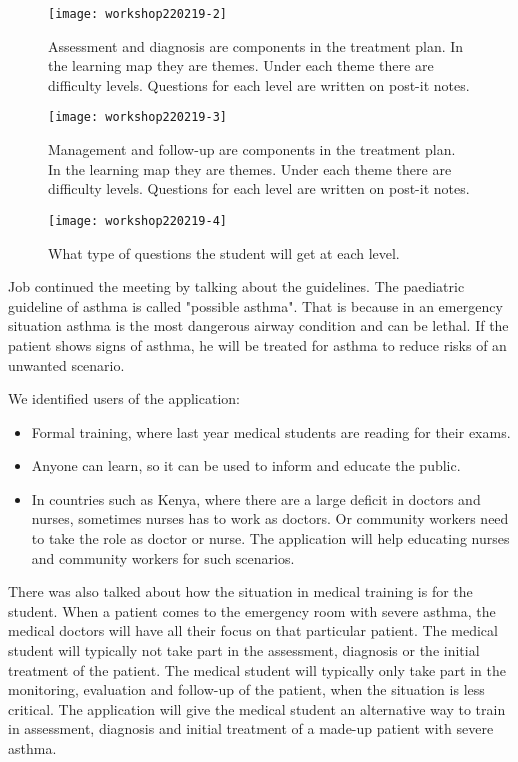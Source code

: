 \begin{figure}[h!]
	\caption {Assessment and diagnosis are components in the treatment plan. In the learning map they are themes. Under each theme there are difficulty levels. Questions for each level are written on post-it notes.}
	\texttt{[image: workshop220219-2]}
\end{figure}

\begin{figure}[h!]
	\caption {Management and follow-up are components in the treatment plan. In the learning map they are themes. Under each theme there are difficulty levels. Questions for each level are written on post-it notes.}
	\texttt{[image: workshop220219-3]}
\end{figure}

\begin{figure}[h!]
	\caption {What type of questions the student will get at each level.}
	\texttt{[image: workshop220219-4]}
\end{figure}

Job continued the meeting by talking about the guidelines. The paediatric guideline of asthma is called "possible asthma". That is because in an emergency situation asthma is the most dangerous airway condition and can be lethal. If the patient shows signs of asthma, he will be treated for asthma to reduce risks of an unwanted scenario.

We identified users of the application: 
\begin{itemize}
	\item Formal training, where last year medical students are reading for their exams.
	\item Anyone can learn, so it can be used to inform and educate the public.
	\item In countries such as Kenya, where there are a large deficit in doctors and nurses, sometimes nurses has to work as doctors. Or community workers need to take the role as doctor or nurse. The application will help educating nurses and community workers for such scenarios.
\end{itemize}
 
 There was also talked about how the situation in medical training is for the student. When a patient comes to the emergency room with severe asthma, the medical doctors will have all their focus on that particular patient. The medical student will typically not take part in the assessment, diagnosis or the initial treatment of the patient. The medical student will typically only take part in the monitoring, evaluation and follow-up of the patient, when the situation is less critical. The application will give the medical student an alternative way to train in assessment, diagnosis and initial treatment of a made-up patient with severe asthma. 

